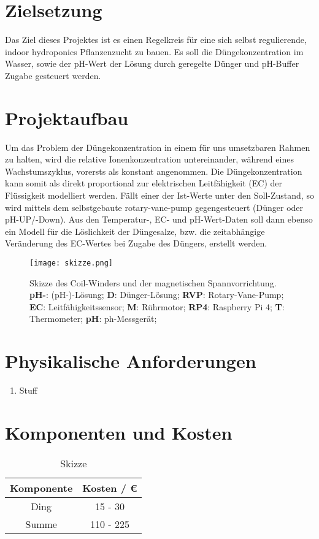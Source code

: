 
\section*{Zielsetzung}
Das Ziel dieses Projektes ist es einen Regelkreis für eine sich selbst regulierende, indoor hydroponics Pflanzenzucht zu bauen.
Es soll die Düngekonzentration im Wasser, sowie der pH-Wert der Lösung durch geregelte Dünger und pH-Buffer Zugabe gesteuert werden.

\section*{Projektaufbau}
Um das Problem der Düngekonzentration in einem für uns umsetzbaren Rahmen zu halten, wird die relative Ionenkonzentration untereinander, während eines Wachstumszyklus, vorersts als konstant angenommen.
Die Düngekonzentration kann somit als direkt proportional zur elektrischen Leitfähigkeit (EC) der Flüssigkeit modelliert werden.
Fällt einer der Ist-Werte unter den Soll-Zustand, so wird mittels dem selbstgebaute rotary-vane-pump gegengesteuert (Dünger oder pH-UP/-Down).
Aus den Temperatur-, EC- und pH-Wert-Daten soll dann ebenso ein Modell für die Löslichkeit der Düngesalze, bzw. die zeitabhängige Veränderung des EC-Wertes bei Zugabe des Düngers, erstellt werden.

\begin{figure}[H]
    \centering
    \texttt{[image: skizze.png]}
    \caption{
        Skizze des Coil-Winders und der magnetischen Spannvorrichtung.
        \textbf{pH-}: (pH-)-Lösung; 
        \textbf{D}: Dünger-Lösung; 
        \textbf{RVP}: Rotary-Vane-Pump; 
        \textbf{EC}: Leitfähigkeitssensor; 
        \textbf{M}: Rührmotor; 
        \textbf{RP4}: Raspberry Pi 4; 
        \textbf{T}: Thermometer; 
        \textbf{pH}: ph-Messgerät;
    }
\end{figure}

\section*{Physikalische Anforderungen}
\begin{enumerate}
    \item Stuff
\end{enumerate}


\section*{Komponenten und Kosten}
\begin{table}[H]
    \centering
    \caption{
        Skizze
    }
    \begin{tabular}{| c | c |}
        \hline
        Komponente &  Kosten / \euro{}\\
        \hline
        Ding & 15 - 30  \\
        \hline
        \hline
        Summe & 110 - 225  \\
        \hline
    \end{tabular}
    \label{tab:Komponenten}
\end{table}


